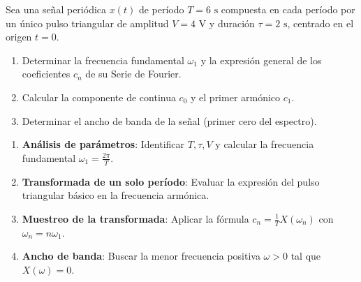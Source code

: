 \newpage
\begin{problema}
Sea una señal periódica $x(t)$ de período $T = 6\text{ s}$ compuesta en cada período por un único pulso triangular de amplitud $V = 4\text{ V}$ y duración $\tau = 2\text{ s}$, centrado en el origen $t=0$.

\begin{enumerate}[label=\alph*)]
    \item Determinar la frecuencia fundamental $\omega_1$ y la expresión general de los coeficientes $c_n$ de su Serie de Fourier.
    \item Calcular la componente de continua $c_0$ y el primer armónico $c_1$.
    \item Determinar el ancho de banda de la señal (primer cero del espectro).
\end{enumerate}
\end{problema}

\begin{mecanizado}
\begin{enumerate}
    \item \textbf{Análisis de parámetros}: Identificar $T, \tau, V$ y calcular la frecuencia fundamental $\omega_1 = \frac{2\pi}{T}$.
    \item \textbf{Transformada de un solo período}: Evaluar la expresión del pulso triangular básico en la frecuencia armónica.
    \item \textbf{Muestreo de la transformada}: Aplicar la fórmula $c_n = \frac{1}{T} X(\omega_n)$ con $\omega_n = n\omega_1$.
    \item \textbf{Ancho de banda}: Buscar la menor frecuencia positiva $\omega > 0$ tal que $X(\omega) = 0$.
\end{enumerate}
\end{mecanizado}


